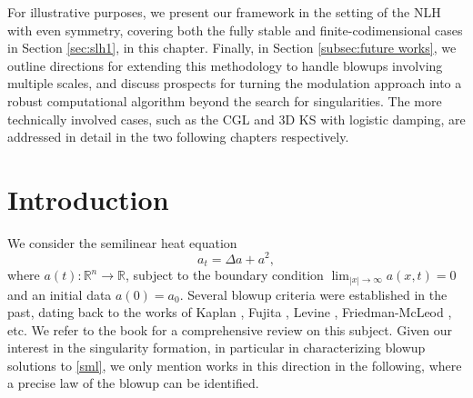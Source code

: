 \documentclass[12pt]{caltech_thesis}
\numberwithin{equation}{section}
\begin{document}
For illustrative purposes, we present our framework in the setting of the NLH with even symmetry, covering both the fully stable and finite-codimensional cases in Section \ref{sec:slh1}, in this chapter. Finally, in Section \ref{subsec:future works}, we outline directions for extending this methodology to handle blowups involving multiple scales, and discuss prospects for turning the modulation approach into a robust computational algorithm beyond the search for singularities. The more technically involved cases, such as the CGL and 3D KS with logistic damping, are addressed in detail in the two following chapters respectively.

\section{Introduction}
We consider the semilinear heat equation \begin{equation}
    \label{sml}
    a_t=\Delta a + a^2,
\end{equation}
where $a(t): {\mathbb{R}}^n \to {\mathbb{R}}$, subject to the boundary condition $\lim_{|x| \to \infty} a(x,t) = 0$ and an initial data $a(0) = a_0$. 
Several blowup criteria were established in the past, dating back to the works of Kaplan \cite{Kapcpam63}, Fujita \cite{FUJsut66}, Levine \cite{LEVarma73},  Friedman-McLeod \cite{FMiunj85}, etc. We refer to the book \cite{quittner2019superlinear} for a comprehensive review on this subject.   Given our interest in the singularity formation, in particular in characterizing blowup solutions to \eqref{sml}, we only mention works in this direction in the following, where a precise law of the blowup can be identified.
\end{document}
